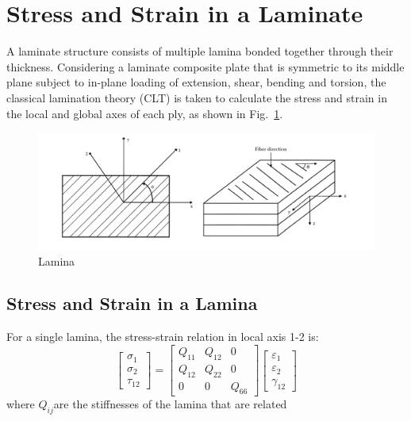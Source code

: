 \documentclass[USenglish]{article}
\begin{document}
\section{Stress and Strain in a Laminate}
A laminate structure consists of multiple lamina bonded together through their thickness.
Considering a laminate composite plate that is symmetric to its middle plane subject to in-plane
loading of extension, shear, bending and torsion, the classical lamination theory (CLT) is taken to
calculate the stress and strain in the local and global axes of each ply, as shown in
Fig.~\ref{fig:lamina}.


\begin{figure}
	\centering
	\includegraphics[width=\linewidth]{A_laminate_design_images/lamina_local_global_axes.png}
\caption{Lamina}
  	\label{fig:lamina}
\end{figure}



\subsection{Stress and Strain in a Lamina}
For a single lamina, the stress-strain relation in local axis 1-2 is:
\begin{equation}
    \begin{bmatrix}
        \sigma _1\\
        \sigma _2\\
        \tau_{12}
    \end{bmatrix}
    =
    \begin{bmatrix}
        Q_{11} & Q_{12} & 0\\
        Q_{12} & Q_{22} & 0\\
        0      &  0     & Q_{66}
    \end{bmatrix}
    \begin{bmatrix}
        \varepsilon_1\\
        \varepsilon_2\\\gamma_{12}
    \end{bmatrix}
\end{equation}
where $Q_{ij} $are the stiffnesses of the lamina that are related
\end{document}

